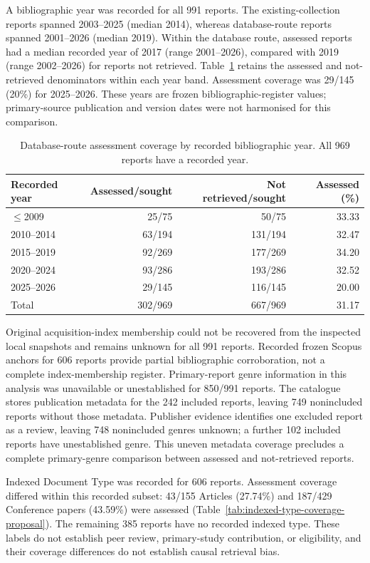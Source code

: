 \documentclass[manuscript,review,screen]{acmart}
\begin{document}
A bibliographic year was recorded for all 991 reports. The existing-collection reports spanned 2003--2025 (median 2014), whereas database-route reports spanned 2001--2026 (median 2019). Within the database route, assessed reports had a median recorded year of 2017 (range 2001--2026), compared with 2019 (range 2002--2026) for reports not retrieved. Table~\ref{tab:retrieval-coverage-proposal} retains the assessed and not-retrieved denominators within each year band. Assessment coverage was 29/145 (20\%) for 2025--2026. These years are frozen bibliographic-register values; primary-source publication and version dates were not harmonised for this comparison.

\begin{table}[htbp]
\centering
\caption{Database-route assessment coverage by recorded bibliographic year. All 969 reports have a recorded year.}
\label{tab:retrieval-coverage-proposal}
\begin{tabular}{lrrr}
\hline
Recorded year & Assessed/sought & Not retrieved/sought & Assessed (\%) \\
\hline
$\leq$2009 & 25/75 & 50/75 & 33.33 \\
2010--2014 & 63/194 & 131/194 & 32.47 \\
2015--2019 & 92/269 & 177/269 & 34.20 \\
2020--2024 & 93/286 & 193/286 & 32.52 \\
2025--2026 & 29/145 & 116/145 & 20.00 \\
Total & 302/969 & 667/969 & 31.17 \\
\hline
\end{tabular}
\end{table}

Original acquisition-index membership could not be recovered from the inspected local snapshots and remains unknown for all 991 reports. Recorded frozen Scopus anchors for 606 reports provide partial bibliographic corroboration, not a complete index-membership register. Primary-report genre information in this analysis was unavailable or unestablished for 850/991 reports. The catalogue stores publication metadata for the 242 included reports, leaving 749 nonincluded reports without those metadata. Publisher evidence identifies one excluded report as a review, leaving 748 nonincluded genres unknown; a further 102 included reports have unestablished genre. This uneven metadata coverage precludes a complete primary-genre comparison between assessed and not-retrieved reports.


Indexed Document Type was recorded for 606 reports. Assessment coverage differed within this recorded subset: 43/155 Articles (27.74\%) and 187/429 Conference papers (43.59\%) were assessed (Table~\ref{tab:indexed-type-coverage-proposal}). The remaining 385 reports have no recorded indexed type. These labels do not establish peer review, primary-study contribution, or eligibility, and their coverage differences do not establish causal retrieval bias.
\end{document}
